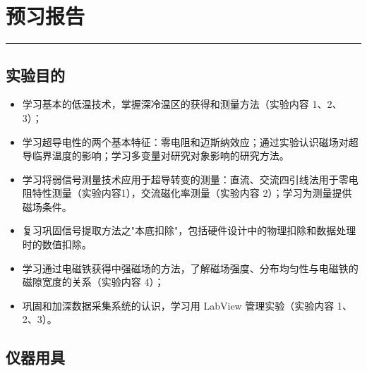 
\clearpage
\setcounter{section}{0}
\section{预习报告}
\vspace{-0.7cm} %
\noindent\textcolor{fgraygreen}{\rule{0.382\textwidth}{2pt} }
\vspace{7pt}

\subsection{实验目的}
\begin{itemize}
    \item 学习基本的低温技术，掌握深冷温区的获得和测量方法（实验内容 1、2、3）；
    
    \item 学习超导电性的两个基本特征：零电阻和迈斯纳效应；通过实验认识磁场对超导临界温度的影响；学习多变量对研究对象影响的研究方法。
    
    \item 学习将弱信号测量技术应用于超导转变的测量：直流、交流四引线法用于零电阻特性测量（实验内容1），交流磁化率测量（实验内容 2）；学习为测量提供磁场条件。
    
    \item 复习巩固信号提取方法之"本底扣除"，包括硬件设计中的物理扣除和数据处理时的数值扣除。
    
    \item 学习通过电磁铁获得中强磁场的方法，了解磁场强度、分布均匀性与电磁铁的磁隙宽度的关系（实验内容 4）；
    
    \item 巩固和加深数据采集系统的认识，学习用 LabView 管理实验（实验内容 1、2、3）。
\end{itemize}
\subsection{仪器用具}

